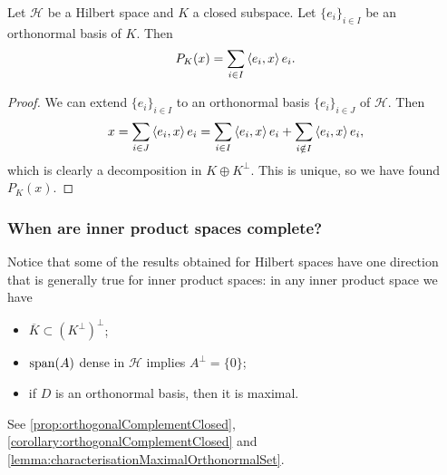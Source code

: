 \begin{lemma}
Let $\mathcal{H}$ be a Hilbert space and $K$ a closed subspace. Let $\{e_i\}_{i\in I}$ be an orthonormal basis of $K$. Then
\[ P_K(x) = \sum_{i\in I} \left\langle e_i,x \right\rangle e_i. \]
\end{lemma}
\begin{proof}
We can extend $\{e_i\}_{i\in I}$ to an orthonormal basis $\{e_i\}_{i\in J}$ of $\mathcal{H}$. Then
\[ x = \sum_{i\in J}\left\langle e_i,x \right\rangle e_i = \sum_{i\in I}\left\langle e_i,x \right\rangle e_i + \sum_{i\notin I}\left\langle e_i,x \right\rangle e_i, \]
which is clearly a decomposition in $K\oplus K^\perp$. This is unique, so we have found $P_K(x)$.
\end{proof}

\subsubsection{When are inner product spaces complete?}
Notice that some of the results obtained for Hilbert spaces have one direction that is generally true for inner product spaces: in any inner product space we have
\begin{itemize}
\item $\overline{K}\subset (K^\perp)^\perp$;
\item $\operatorname{span}(A)$ dense in $\mathcal{H}$ implies $A^\perp = \{0\}$;
\item if $D$ is an orthonormal basis, then it is maximal.
\end{itemize}
See \ref{prop:orthogonalComplementClosed}, \ref{corollary:orthogonalComplementClosed} and \ref{lemma:characterisationMaximalOrthonormalSet}.


